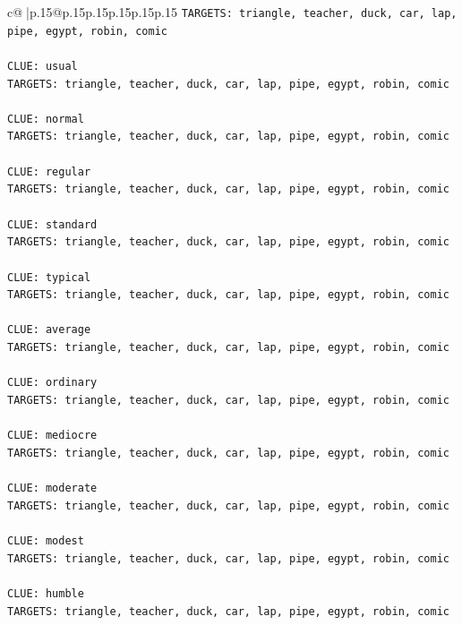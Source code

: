 \documentclass{article}
\begin{document}
{\begin{supertabular}{c@{$\;$}|p{.15\linewidth}@{}p{.15\linewidth}p{.15\linewidth}p{.15\linewidth}p{.15\linewidth}p{.15\linewidth}}
{{{\texttt{TARGETS: triangle, teacher, duck, car, lap, pipe, egypt, robin, comic} \\
\\ 
\texttt{CLUE: usual} \\
\texttt{TARGETS: triangle, teacher, duck, car, lap, pipe, egypt, robin, comic} \\
\\ 
\texttt{CLUE: normal} \\
\texttt{TARGETS: triangle, teacher, duck, car, lap, pipe, egypt, robin, comic} \\
\\ 
\texttt{CLUE: regular} \\
\texttt{TARGETS: triangle, teacher, duck, car, lap, pipe, egypt, robin, comic} \\
\\ 
\texttt{CLUE: standard} \\
\texttt{TARGETS: triangle, teacher, duck, car, lap, pipe, egypt, robin, comic} \\
\\ 
\texttt{CLUE: typical} \\
\texttt{TARGETS: triangle, teacher, duck, car, lap, pipe, egypt, robin, comic} \\
\\ 
\texttt{CLUE: average} \\
\texttt{TARGETS: triangle, teacher, duck, car, lap, pipe, egypt, robin, comic} \\
\\ 
\texttt{CLUE: ordinary} \\
\texttt{TARGETS: triangle, teacher, duck, car, lap, pipe, egypt, robin, comic} \\
\\ 
\texttt{CLUE: mediocre} \\
\texttt{TARGETS: triangle, teacher, duck, car, lap, pipe, egypt, robin, comic} \\
\\ 
\texttt{CLUE: moderate} \\
\texttt{TARGETS: triangle, teacher, duck, car, lap, pipe, egypt, robin, comic} \\
\\ 
\texttt{CLUE: modest} \\
\texttt{TARGETS: triangle, teacher, duck, car, lap, pipe, egypt, robin, comic} \\
\\ 
\texttt{CLUE: humble} \\
\texttt{TARGETS: triangle, teacher, duck, car, lap, pipe, egypt, robin, comic} \\
}}}
\end{supertabular}}
\end{document}
